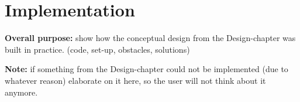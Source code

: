 \section{Implementation}
\textbf{Overall purpose:} show how the conceptual design from the Design-chapter was built in practice. (code, set-up, obstacles, solutions)

\noindent\textbf{Note:} if something from the Design-chapter could not be implemented (due to whatever reason) elaborate on it here, so the user will not think about it anymore.
